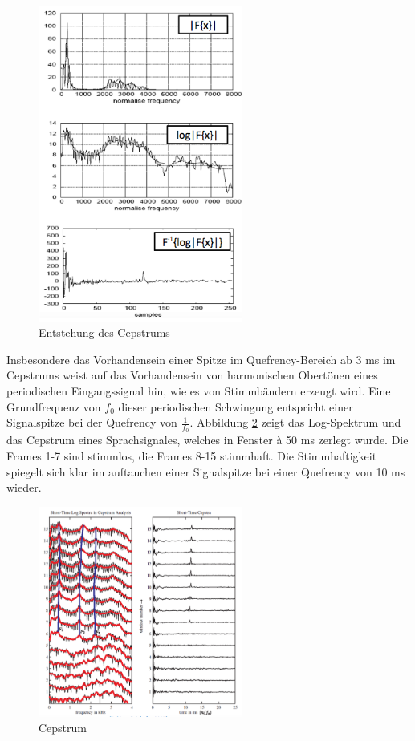 \begin{figure}[h]
	\centering
	\includegraphics[width=0.6\textwidth]{bilder/Cepstrum02.png}
	\caption{Entstehung des Cepstrums}
	\label{img:cepstrum}
\end{figure}

Insbesondere das Vorhandensein einer Spitze im Quefrency-Bereich ab 3 ms im Cepstrums weist auf das Vorhandensein von harmonischen Obertönen eines periodischen Eingangssignal hin, wie es von Stimmbändern erzeugt wird. Eine Grundfrequenz von $f_0$ dieser periodischen Schwingung entspricht einer Signalspitze bei der Quefrency von $\frac{1}{f_0}$. Abbildung \ref{img:cepstrum2} zeigt das Log-Spektrum und das Cepstrum eines Sprachsignales, welches in Fenster à 50 ms zerlegt wurde. Die Frames 1-7 sind stimmlos, die Frames 8-15 stimmhaft. Die Stimmhaftigkeit spiegelt sich klar im auftauchen einer Signalspitze bei einer Quefrency von 10 ms wieder.\cite{ricardo_ceps}


\begin{figure}[h]
	\centering
	\includegraphics[width=0.6\textwidth]{bilder/Cepstrum03.png}
	\caption{Cepstrum}
	\label{img:cepstrum2}
\end{figure}


